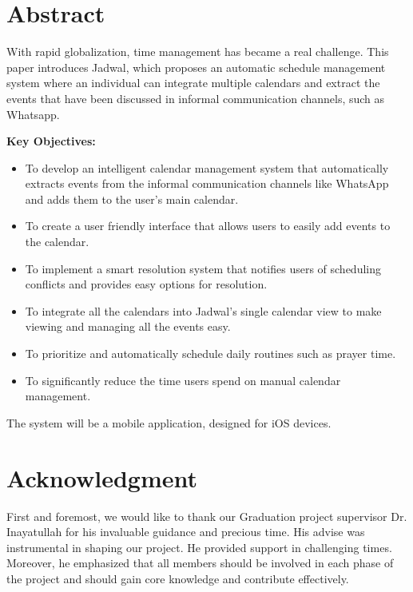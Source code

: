 \documentclass[12pt,a4paper,twoside]{report}
\begin{document}
\begin{singlespace}

    \chapter*{Abstract}

    \begin{justify}
        With rapid globalization, time management has became a real challenge. This paper introduces Jadwal, which proposes an automatic schedule management system where an individual can integrate multiple calendars and extract the events that have been discussed in informal communication channels, such as Whatsapp.

        \textbf{Key Objectives:}
        \begin{itemize}
            \item To develop an intelligent calendar management system that automatically extracts events from the informal communication channels like WhatsApp and adds them to the user's main calendar.
            \item To create a user friendly interface that allows users to easily add events to the calendar.
            \item To implement a smart resolution system that notifies users of scheduling conflicts and provides easy options for resolution.
            \item To integrate all the calendars into Jadwal's single calendar view to make viewing and managing all the events easy.
            \item To prioritize and automatically schedule daily routines such as prayer time.
            \item To significantly reduce the time users spend on manual calendar management.
        \end{itemize}


        \begin{center}
            The system will be a mobile application, designed for iOS devices.
        \end{center}
    \end{justify}

    \chapter*{Acknowledgment}

    \begin{justify}
        First and foremost, we would like to thank our Graduation project supervisor Dr. Inayatullah for his invaluable guidance and precious time. His advise was instrumental in shaping our project. He provided support in challenging times. Moreover, he emphasized that all members should be involved in each phase of the project and should gain core knowledge and contribute effectively.


\end{justify}
\end{singlespace}
\end{document}

